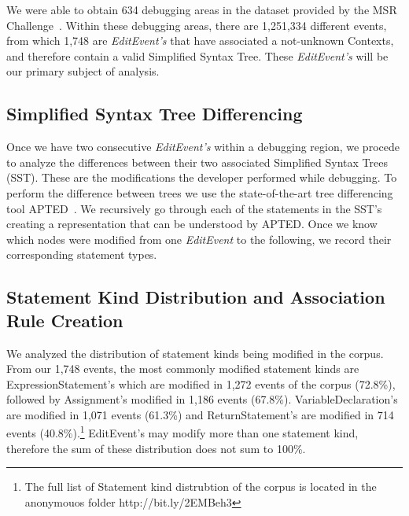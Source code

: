 \documentclass[sigconf]{acmart}
\begin{document}
We were able to obtain 634 debugging areas in the dataset 
provided by the MSR Challenge~\cite{msr18challenge}.
Within these debugging areas, there are 1,251,334
different events, from which 1,748 are \textit{EditEvent's}
that have associated a not-unknown Contexts, and therefore 
contain a valid Simplified Syntax Tree. These \textit{EditEvent's} 
will be our primary subject of analysis.

\subsection{Simplified Syntax Tree Differencing}
\label{sstDiff}
Once we have two consecutive \textit{EditEvent's} within
a debugging region, we procede to analyze the differences
between their two associated Simplified Syntax Trees (SST).
These are the modifications the developer performed
while debugging.
To perform the difference between trees we use the 
state-of-the-art tree differencing
tool APTED~\cite{Pawlik16Apted}.
We recursively go through each of the statements in the 
SST's creating a representation that can be understood by
APTED. 
Once we know which nodes were modified from one \textit{EditEvent}
to the following, we record their corresponding statement types.

\subsection{Statement Kind Distribution and Association Rule Creation}

We analyzed the distribution of statement kinds being modified
in the corpus.
From our 1,748 events, the most commonly modified statement
kinds are ExpressionStatement's which are modified in 1,272 
events of
the corpus (72.8\%), followed by Assignment's modified in 1,186
events (67.8\%). VariableDeclaration's are modified in 1,071
events (61.3\%) and ReturnStatement's are modified in 714
events (40.8\%).\footnote{The full list of Statement kind
distrubtion of the corpus is located in the anonymouos folder 
http://bit.ly/2EMBeh3} 
EditEvent's may modify more than one
statement kind, therefore the sum of these distribution
does not sum to 100\%.



\end{document}

